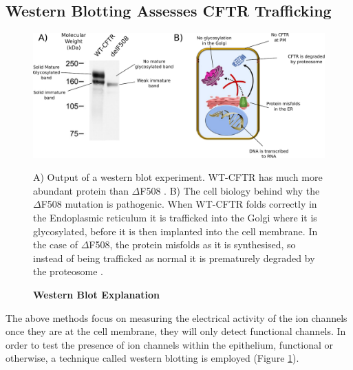 \subsection{Western Blotting Assesses CFTR Trafficking}
\begin{figure}
	\label{western_blot}
	\begin{center}
	\includegraphics[width=1\textwidth]{figures/western_blot_explanation.pdf}
	\end{center}
	\captionsetup{singlelinecheck = false, justification=raggedright}
	\caption[Western Blot Explanation] {\textbf{Western Blot Explanation}}{A) Output of a western blot experiment. WT-CFTR has much more abundant protein than $\Delta$F508 \cite{chang2008}. B) The cell biology behind why the $\Delta$F508 mutation is pathogenic. When WT-CFTR folds correctly in the Endoplasmic reticulum it is trafficked into the Golgi where it is glycosylated, before it is then implanted into the cell membrane. In the case of $\Delta$F508, the protein misfolds as it is synthesised, so instead of being trafficked as normal it is prematurely degraded by the proteosome \cite{lopes-pacheco2016a}.} 
\end{figure}
The above methods focus on measuring the electrical activity of the ion channels once they are at the cell membrane, they will only detect functional channels. In order to test the presence of ion channels within the epithelium, functional or otherwise, a technique called western blotting is employed (Figure \ref{western_blot}).


